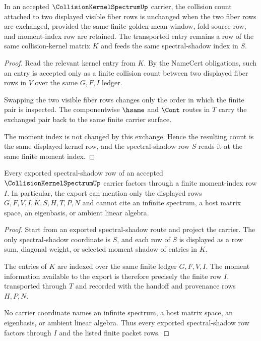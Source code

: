 \begin{theorem}
\label{thm:collision-kernel-spectrum-fiber-row-symmetry}
In an accepted $\CollisionKernelSpectrumUp$ carrier, the collision count attached to two displayed visible fiber rows is unchanged when the two fiber rows are exchanged, provided the same finite golden-mean window, fold-source row, and moment-index row are retained. The transported entry remains a row of the same collision-kernel matrix $K$ and feeds the same spectral-shadow index in $S$.
\end{theorem}
\begin{proof}
Read the relevant kernel entry from $K$. By the NameCert obligations, such an entry is accepted only as a finite collision count between two displayed fiber rows in $V$ over the same $G,F,I$ ledger.

Swapping the two visible fiber rows changes only the order in which the finite pair is inspected. The componentwise $\hsame$ and $\Cont$ routes in $T$ carry the exchanged pair back to the same finite carrier surface.

The moment index is not changed by this exchange. Hence the resulting count is the same displayed kernel row, and the spectral-shadow row $S$ reads it at the same finite moment index.
\end{proof}

\begin{theorem}
\label{thm:collision-kernel-spectrum-moment-index-projection}
Every exported spectral-shadow row of an accepted $\CollisionKernelSpectrumUp$ carrier factors through a finite moment-index row $I$. In particular, the export can mention only the displayed rows $G,F,V,I,K,S,H,T,P,N$ and cannot cite an infinite spectrum, a host matrix space, an eigenbasis, or ambient linear algebra.
\end{theorem}
\begin{proof}
Start from an exported spectral-shadow route and project the carrier. The only spectral-shadow coordinate is $S$, and each row of $S$ is displayed as a row sum, diagonal weight, or selected moment shadow of entries in $K$.

The entries of $K$ are indexed over the same finite ledger $G,F,V,I$. The moment information available to the export is therefore precisely the finite row $I$, transported through $T$ and recorded with the handoff and provenance rows $H,P,N$.

No carrier coordinate names an infinite spectrum, a host matrix space, an eigenbasis, or ambient linear algebra. Thus every exported spectral-shadow row factors through $I$ and the listed finite packet rows.
\end{proof}


